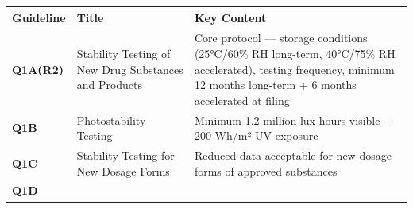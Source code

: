 \documentclass[
  11pt,
  a4paper,
]{report}
\begin{document}
\begin{longtable}[]{@{}lll@{}}
\toprule
\begin{minipage}[b]{0.32\columnwidth}\raggedright
Guideline\strut
\end{minipage} & \begin{minipage}[b]{0.21\columnwidth}\raggedright
Title\strut
\end{minipage} & \begin{minipage}[b]{0.38\columnwidth}\raggedright
Key Content\strut
\end{minipage}\tabularnewline
\midrule
\endhead
\begin{minipage}[t]{0.32\columnwidth}\raggedright
\textbf{Q1A(R2)}\strut
\end{minipage} & \begin{minipage}[t]{0.21\columnwidth}\raggedright
Stability Testing of New Drug Substances and Products\strut
\end{minipage} & \begin{minipage}[t]{0.38\columnwidth}\raggedright
Core protocol --- storage conditions (25°C/60\% RH long-term, 40°C/75\%
RH accelerated), testing frequency, minimum 12 months long-term + 6
months accelerated at filing\strut
\end{minipage}\tabularnewline
\begin{minipage}[t]{0.32\columnwidth}\raggedright
\textbf{Q1B}\strut
\end{minipage} & \begin{minipage}[t]{0.21\columnwidth}\raggedright
Photostability Testing\strut
\end{minipage} & \begin{minipage}[t]{0.38\columnwidth}\raggedright
Minimum 1.2 million lux-hours visible + 200 Wh/m² UV exposure\strut
\end{minipage}\tabularnewline
\begin{minipage}[t]{0.32\columnwidth}\raggedright
\textbf{Q1C}\strut
\end{minipage} & \begin{minipage}[t]{0.21\columnwidth}\raggedright
Stability Testing for New Dosage Forms\strut
\end{minipage} & \begin{minipage}[t]{0.38\columnwidth}\raggedright
Reduced data acceptable for new dosage forms of approved
substances\strut
\end{minipage}\tabularnewline
\begin{minipage}[t]{0.32\columnwidth}\raggedright
\textbf{Q1D}\strut
\end{minipage} & \begin{minipage}[t]{0.21\columnwidth}\raggedright

\end{minipage}
\end{longtable}
\end{document}
